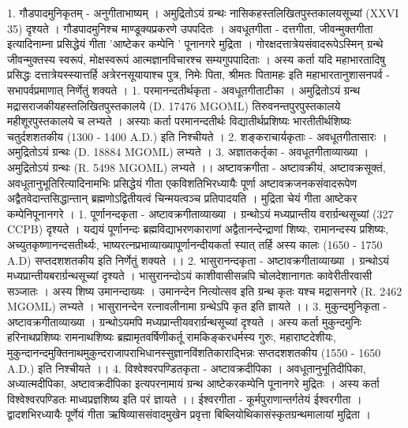1. गौडपादमुनिकृतम् - अनुगीताभाष्यम् । अमुद्रितोऽयं ग्रन्थः नासिकहस्तलिखितपुस्तकालयसूच्यां (XXVI 35) दृश्यते । गौडपादमुनिश्च माण्डूक्यप्रकरणे उपपदितः । 
अवधूतगीता - 
दत्तगीता, जीवन्मुक्तगीता इत्यादिनाम्ना प्रसिद्धेयं गीता 'आष्टेकर कम्पेनि ' पूनानगरे मुद्रिता । गोरक्षदत्तात्रेयसंवादरूपेऽस्मिन् ग्रन्थे जीवन्मुक्तस्य स्वरूपं, मोक्षस्वरूपं आत्मज्ञानविचारश्च सम्यगुपपादिताः । अस्य कर्ता यदि महाभारतादिषु प्रसिद्धः दत्तात्रेयस्स्यात्तर्हि अत्रेरनसूयायाश्च पुत्र, निमेः पिता, श्रीमतः पितामहः इति महाभारतानुशासनपर्व - सभापर्वप्रमाणात् निर्णेतुं शक्यते । 
1.  परमानन्दतीर्थकृता - अवधूतगीताटीका ।
अमुद्रितोऽयं ग्रन्थ मद्रासराजकीयहस्तलिखितपुस्तकालये (D. 17476 MGOML) तिरुवनन्तपुरपुस्तकालये महीशूरपुस्तकालये च लभ्यते । अस्याः कर्ता परमानन्दतीर्थः विद्यातीर्थप्रशिष्यः भारतीतीर्थशिष्यः चतुर्दशशतकीय (1300 - 1400 A.D.) इति निश्चीयते । 
2. शङ्कराचार्यकृताः - अवधूतगीतासारः । अमुद्रितोऽयं ग्रन्थः (D. 18884 MGOML) लभ्यते । 
3. अज्ञातकर्तृका - अवधूतगीताव्याख्या । अमुद्रितोऽयं ग्रन्थः (R. 5498 MGOML) लभ्यते ।। 
अष्टावक्रगीता - 
अष्टावक्रीयं, अष्टावक्रसूक्तं, अवधूतानुभूतिरित्यादिनामभिः प्रसिद्धेयं गीता एकविशतिभिरध्यायैः पूर्णा अष्टावक्रजनकसंवादरूपेण अद्वैतवेदान्तसिद्धान्तान् ब्रह्मणोऽद्वितीयत्वं चिन्मयत्वञ्च प्रतिपादयति । मुद्रिता चेयं गीता आष्टेकर कम्पेनिपूनानगरे ।
1. पूर्णानन्दकृता - अष्टावक्रगीताव्याख्या । 
ग्रन्थोऽयं मध्यप्रान्तीय वरार्ग्रन्थसूच्यां (327 CCPB) दृश्यते । यद्ययं पूर्णानन्दः ब्रह्मविद्याभरणकाराणां अद्वैतानन्देन्द्राणां शिष्यः, रामानन्दस्य प्रशिष्यः, अच्युतकृष्णानन्दसतीर्थ्यः, भाष्यरत्नप्रभाव्याख्यापूर्णानन्दीयकर्ता स्यात् तर्हि अस्य कालः (1650 - 1750 A.D) सप्तदशशतकीय इति निर्णेतुं शक्यते ।। 
2. भासुरानन्दकृता - अष्टावक्रगीताव्याख्या ।
ग्रन्थोऽयं मध्यप्रान्तीयबरार्ग्रन्थसूच्यां दृश्यते । भासुरानन्दोऽयं काशीवासीसन्नपि चोलदेशानागतः कावेरीतीरवासी सञ्जातः । अस्य शिष्य उमानन्दाख्यः । उमानन्देन नित्योत्सव इति ग्रन्थ कृतः यश्च मद्रासनगरे (R. 2462 MGOML) लभ्यते । भासुरानन्देन रत्नावलीनामा ग्रन्थेऽपि कृत इति ज्ञायते ।। 
3. मुकुन्दमुनिकृता - अष्टावक्रगीताव्याख्या । 
ग्रन्थोऽयमपि मध्यप्रान्तीयवरार्ग्रन्थसूच्यां दृश्यते । अस्य कर्ता मुकुन्दमुनिः हरिनाथप्रशिष्यः रामनाथशिष्यः ब्रह्मामृतवर्षिणीकर्तू रामकिङ्करधर्मस्य गुरुः, महाराष्टदेशीयः, मुकुन्दानन्दमुक्तिनाथमुकुन्दराजापराभिधानस्सुज्ञानविंशतिकाराद्भिन्नः सप्तदशशतकीय (1550 - 1650 A.D.) इति निश्चीयते ।। 
4. विश्वेश्वरपण्डितकृता - अष्टावक्रदीपिका ।
अवधूतानुभूतिदीपिका, अध्यात्मदीपिका, अष्टावक्रदीपिका इत्यपरनामायं ग्रन्थ आष्टेकरकम्पेनि पूनानगरे मुद्रितः । अस्य कर्ता विश्वेश्वरपण्डितः माध्वप्रज्ञशिष्य इति परं ज्ञायते ।। 
ईश्वरगीता - 
कूर्मपुराणान्तर्गतेयं ईश्वरगीता । द्वादशभिरध्यायैः पूर्णेयं गीता ऋषिव्याससंवादमुखेन प्रवृत्ता बिब्लियोथिकासंस्कृतग्रन्थमालायां मुद्रिता । 
